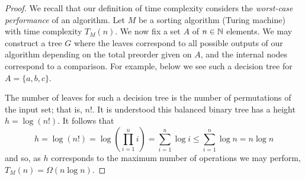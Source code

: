 \begin{proof}
    We recall that our definition of time complexity considers the \emph{worst-case performance} of an algorithm. Let $M$ be a sorting algorithm (Turing machine) with time complexity $T_M(n)$. We now fix a set $A$ of $n \in \mathbb N$ elements. We may construct a tree $G$ where the leaves correspond to all possible outputs of our algorithm depending on the total preorder given on $A$, and the internal nodes correspond to a comparison. For example, below we see such a decision tree for $A = \{a,b,c\}$.
    \begin{center}
    \end{center}
    The number of leaves for such a decision tree is the number of permutations of the input set; that is, $n!$. It is understood this balanced binary tree has a height $h = \log(n!)$. It follows that
    \[
        h = \log(n!)
        = \log\left(\prod_{i=1}^n i\right)
        = \sum_{i=1}^n \log i
        \leq \sum_{i=1}^n \log n
        = n\log n
    \]
    and so, as $h$ corresponds to the maximum number of operations we may perform, $T_M(n) = \Omega(n\log n)$. 
\end{proof}

